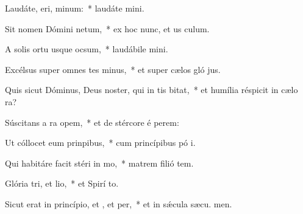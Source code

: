\item Laudáte, eri, minum:~* laudáte  mini.
\item Sit nomen Dómini netum,~* ex hoc nunc, et us  culum.
\item A solis ortu usque  ocsum,~* laudábile  mini.
\item Excélsus super omnes tes minus,~* et super cælos gló jus.
\item Quis sicut Dóminus, Deus noster, qui in tis bitat,~* et humília réspicit in cælo   ra?
\item Súscitans a ra opem,~* et de stércore é perem:
\item Ut cóllocet eum  prinpibus,~* cum princípibus pó i.
\item Qui habitáre facit stéri in mo,~* matrem filió tem.
\item Glória tri, et lio,~* et Spirí to.
\item Sicut erat in princípio, et , et per,~* et in sǽcula sæcu. men.
